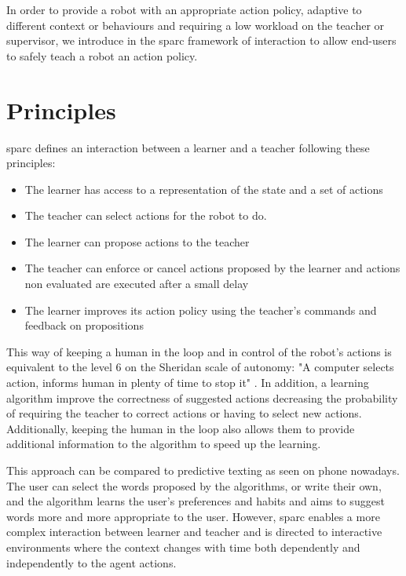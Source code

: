 In order to provide a robot with an appropriate action policy, adaptive to different context or behaviours and requiring a low workload on the teacher or supervisor, we introduce in \cite{senft2015sparc} the \acrfull{sparc} framework of interaction to allow end-users to safely teach a robot an action policy.

\section{Principles} \label{sec:sparc_principles}

\gls{sparc} defines an interaction between a learner and a teacher following these principles:
\begin{itemize}
	\item The learner has access to a representation of the state and a set of actions
	\item The teacher can select actions for the robot to do.
	\item The learner can propose actions to the teacher
	\item The teacher can enforce or cancel actions proposed by the learner and actions non evaluated are executed after a small delay
	\item The learner improves its action policy using the teacher's commands and feedback on propositions
\end{itemize} 

This way of keeping a human in the loop and in control of the robot's actions is equivalent to the level 6 on the Sheridan scale of autonomy: "A computer selects action, informs human in plenty of time to stop it" \citep{sheridan1978human}. In addition, a learning algorithm improve the correctness of suggested actions decreasing the probability of requiring the teacher to correct actions or having to select new actions. Additionally, keeping the human in the loop also allows them to provide additional information to the algorithm to speed up the learning.

This approach can be compared to predictive texting as seen on phone nowadays. The user can select the words proposed by the algorithms, or write their own, and the algorithm learns the user's preferences and habits and aims to suggest words more and more appropriate to the user. However, \gls{sparc} enables a more complex interaction between learner and teacher and is directed to interactive environments where the context changes with time both dependently and independently to the agent actions.

